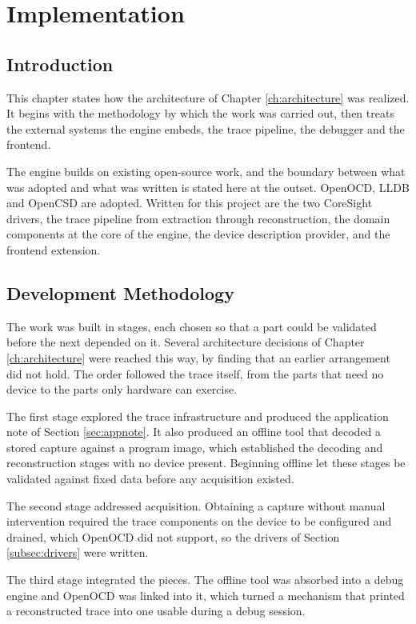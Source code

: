 \chapter{Implementation}

\section*{Introduction}
This chapter states how the architecture of Chapter \ref{ch:architecture} was realized. It begins with the methodology by which the work was carried out, then treats the external systems the engine embeds, the trace pipeline, the debugger and the frontend.

The engine builds on existing open-source work, and the boundary between what was adopted and what was written is stated here at the outset. OpenOCD, LLDB and OpenCSD are adopted. Written for this project are the two CoreSight drivers, the trace pipeline from extraction through reconstruction, the domain components at the core of the engine, the device description provider, and the frontend extension.

\section{Development Methodology}
The work was built in stages, each chosen so that a part could be validated before the next depended on it. Several architecture decisions of Chapter \ref{ch:architecture} were reached this way, by finding that an earlier arrangement did not hold. The order followed the trace itself, from the parts that need no device to the parts only hardware can exercise.

The first stage explored the trace infrastructure and produced the application note of Section \ref{sec:appnote}. It also produced an offline tool that decoded a stored capture against a program image, which established the decoding and reconstruction stages with no device present. Beginning offline let these stages be validated against fixed data before any acquisition existed.

The second stage addressed acquisition. Obtaining a capture without manual intervention required the trace components on the device to be configured and drained, which OpenOCD did not support, so the drivers of Section \ref{subsec:drivers} were written.

The third stage integrated the pieces. The offline tool was absorbed into a debug engine and OpenOCD was linked into it, which turned a mechanism that printed a reconstructed trace into one usable during a debug session.


